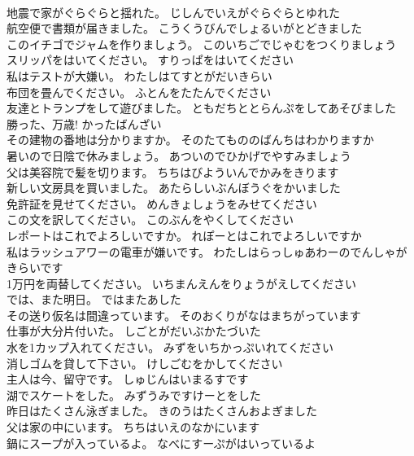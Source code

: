 \documentclass[8pt]{extreport}
\begin{document}
\begin{CJK}{UTF8}{min}
\\	地震で家がぐらぐらと揺れた。	じしんでいえがぐらぐらとゆれた 
\\	航空便で書類が届きました。	こうくうびんでしょるいがとどきました 
\\	このイチゴでジャムを作りましょう。	このいちごでじゃむをつくりましょう 
\\	スリッパをはいてください。	すりっぱをはいてください 
\\	私はテストが大嫌い。	わたしはてすとがだいきらい 
\\	布団を畳んでください。	ふとんをたたんでください 
\\	友達とトランプをして遊びました。	ともだちととらんぷをしてあそびました 
\\	勝った、万歳!	かったばんざい 
\\	その建物の番地は分かりますか。	そのたてもののばんちはわかりますか 
\\	暑いので日陰で休みましょう。	あついのでひかげでやすみましょう 
\\	父は美容院で髪を切ります。	ちちはびよういんでかみをきります 
\\	新しい文房具を買いました。	あたらしいぶんぼうぐをかいました 
\\	免許証を見せてください。	めんきょしょうをみせてください 
\\	この文を訳してください。	このぶんをやくしてください 
\\	レポートはこれでよろしいですか。	れぽーとはこれでよろしいですか 
\\	私はラッシュアワーの電車が嫌いです。	わたしはらっしゅあわーのでんしゃがきらいです 
\\	1万円を両替してください。	いちまんえんをりょうがえしてください 
\\	では、また明日。	ではまたあした 
\\	その送り仮名は間違っています。	そのおくりがなはまちがっています 
\\	仕事が大分片付いた。	しごとがだいぶかたづいた 
\\	水を1カップ入れてください。	みずをいちかっぷいれてください 
\\	消しゴムを貸して下さい。	けしごむをかしてください 
\\	主人は今、留守です。	しゅじんはいまるすです 
\\	湖でスケートをした。	みずうみですけーとをした 
\\	昨日はたくさん泳ぎました。	きのうはたくさんおよぎました 
\\	父は家の中にいます。	ちちはいえのなかにいます 
\\	鍋にスープが入っているよ。	なべにすーぷがはいっているよ 

\end{CJK}
\end{document}
